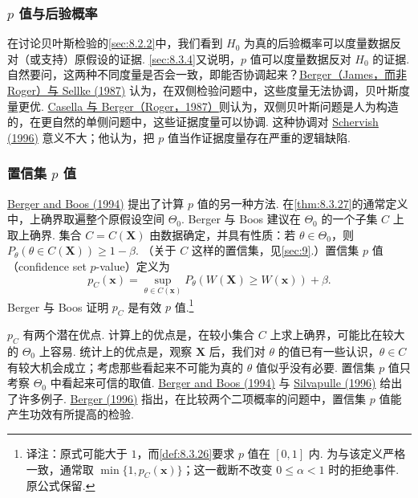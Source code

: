\subsubsection{\texorpdfstring{$p$}{p} 值与后验概率}\label{sec:8.5.3}
在讨论贝叶斯检验的\autoref{sec:8.2.2}中，我们看到 $H_0$ 为真的后验概率可以度量数据反对（或支持）原假设的证据. \autoref{sec:8.3.4}又说明，$p$ 值可以度量数据反对 $H_0$ 的证据. 自然要问，这两种不同度量是否会一致，即能否协调起来？\hyperref[bib:source21]{Berger（James，而非 Roger）与 Sellke (1987)} 认为，在双侧检验问题中，这些度量无法协调，贝叶斯度量更优. \hyperref[bib:source66]{Casella 与 Berger（Roger，1987）}则认为，双侧贝叶斯问题是人为构造的，在更自然的单侧问题中，这些证据度量可以协调. 这种协调对 \hyperref[bib:source277]{Schervish (1996)} 意义不大；他认为，把 $p$ 值当作证据度量存在严重的逻辑缺陷.

\subsubsection{置信集 \texorpdfstring{$p$}{p} 值}\label{sec:8.5.4}
\hyperref[bib:source25]{Berger and Boos (1994)} 提出了计算 $p$ 值的另一种方法. 在\autoref{thm:8.3.27}的通常定义中，上确界取遍整个原假设空间 $\Theta_0$. Berger 与 Boos 建议在 $\Theta_0$ 的一个子集 $C$ 上取上确界. 集合 $C=C(\boldsymbol X)$ 由数据确定，并具有性质：若 $\theta\in\Theta_0$，则 $P_\theta(\theta\in C(\boldsymbol X))\ge1-\beta$. （关于 $C$ 这样的置信集，见\autoref{sec:9}.）置信集 $p$ 值（confidence set $p$-value）定义为
$$p_C(\boldsymbol x)=\sup_{\theta\in C(\boldsymbol x)}P_\theta(W(\boldsymbol X)\ge W(\boldsymbol x))+\beta.$$
Berger 与 Boos 证明 $p_C$ 是有效 $p$ 值.\footnote{译注：原式可能大于 $1$，而\autoref{def:8.3.26}要求 $p$ 值在 $[0,1]$ 内. 为与该定义严格一致，通常取 $\min\{1,p_C(\boldsymbol x)\}$；这一截断不改变 $0\le\alpha<1$ 时的拒绝事件. 原公式保留.}

$p_C$ 有两个潜在优点. 计算上的优点是，在较小集合 $C$ 上求上确界，可能比在较大的 $\Theta_0$ 上容易. 统计上的优点是，观察 $\boldsymbol X$ 后，我们对 $\theta$ 的值已有一些认识，$\theta\in C$ 有较大机会成立；考虑那些看起来不可能为真的 $\theta$ 值似乎没有必要. 置信集 $p$ 值只考察 $\Theta_0$ 中看起来可信的取值. \hyperref[bib:source25]{Berger and Boos (1994)} 与 \hyperref[bib:source291]{Silvapulle (1996)} 给出了许多例子. \hyperref[bib:source24]{Berger (1996)} 指出，在比较两个二项概率的问题中，置信集 $p$ 值能产生功效有所提高的检验.
